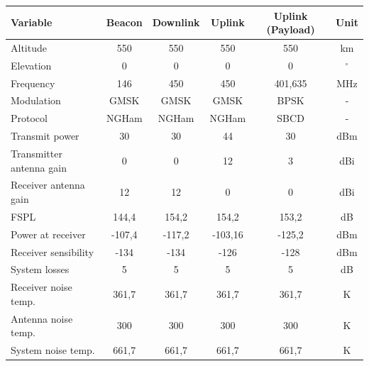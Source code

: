 \begin{table}[!h]
    \centering
    \begin{tabular}{L{0.3\textwidth}ccccc}
        \toprule[1.5pt]
        \textbf{Variable} & \textbf{Beacon} & \textbf{Downlink} & \textbf{Uplink} & \textbf{Uplink (Payload)} & \textbf{Unit}\\
        \midrule
        Altitude                        & 550           & 550           & 550           & 550           & km \\
        Elevation                       & 0             & 0             & 0             & 0             & $^{\circ}$ \\
        Frequency                       & 146           & 450           & 450           & 401,635       & MHz \\
        Modulation                      & GMSK          & GMSK          & GMSK          & BPSK          & - \\
        Protocol                        & NGHam         & NGHam         & NGHam         & SBCD          & - \\
        Transmit power                  & 30            & 30            & 44            & 30            & dBm \\
        Transmitter antenna gain        & 0             & 0             & 12            & 3             & dBi \\
        Receiver antenna gain           & 12            & 12            & 0             & 0             & dBi \\
        FSPL                            & 144,4         & 154,2         & 154,2         & 153,2         & dB \\
        Power at receiver               & -107,4        & -117,2        & -103,16        & -125,2        & dBm \\
        Receiver sensibility            & -134          & -134          & -126          & -128          & dBm \\
        System losses                   & 5             & 5             & 5             & 5             & dB \\
        Receiver noise temp.            & 361,7         & 361,7         & 361,7         & 361,7         & K \\
        Antenna noise temp.             & 300           & 300           & 300           & 300           & K \\
        System noise temp.              & 661,7         & 661,7         & 661,7         & 661,7         & K \\

\end{tabular}
\end{table}
